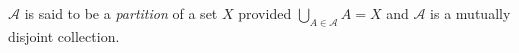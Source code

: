 \guard




\begin{defn}
\label{defn:partition}
  \sloppy $\mathcal{A}$ is said to be a \emph{partition} of a set $X$ provided ${\bigcup_{A\in\mathcal{A}} A = X}$ and $\mathcal{A}$ is a mutually disjoint collection.
\end{defn}
